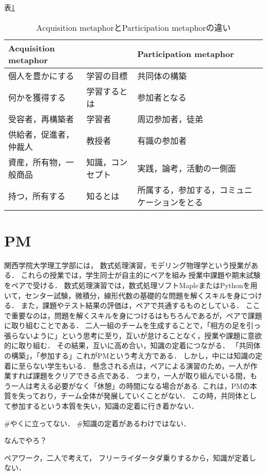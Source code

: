 \documentclass{jsarticle}
\begin{document}
表\ref{tab:org1ce3c3b}
\begin{table}[htbp]
\caption{\label{tab:org1ce3c3b}
Acquisition metaphorとParticipation metaphorの違い}
\centering
\begin{tabular}{|l|l|l|}
\hline
Acquisition metaphor &  & Participation metaphor\\
\hline
個人を豊かにする & 学習の目標 & 共同体の構築\\
何かを獲得する & 学習するとは & 参加者となる\\
受容者，再構築者 & 学習者 & 周辺参加者，徒弟\\
供給者，促進者，仲裁人 & 教授者 & 有識の参加者\\
資産，所有物，一般商品 & 知識，コンセプト & 実践，論考，活動の一側面\\
持つ，所有する & 知るとは & 所属する，参加する，コミュニケーションをとる\\
\hline
\end{tabular}
\end{table}

\section{PM}
\label{sec:org6f32b3c}
関西学院大学理工学部には，
数式処理演習，モデリング物理学という授業がある．
これらの授業では，学生同士が自主的にペアを組み
授業中課題や期末試験をペアで受ける．
数式処理演習では，数式処理ソフトMapleまたはPythonを用いて，センター試験，微積分，線形代数の基礎的な問題を解くスキルを身につける．
また，課題やテスト結果の評価は，ペアで共通するものとしている．
ここで重要なのは，問題を解くスキルを身につけるはもちろんであるが，ペアで課題に取り組むことである．
二人一組のチームを生成することで，「相方の足を引っ張らないように」という思考に至り，互いが怠けることなく，授業や課題に意欲的に取り組む．
その結果，互いに高め合い，知識の定着につながる．
「共同体の構築」，「参加する」これがPMという考え方である．
しかし，中には知識の定着に至らない学生もいる．
懸念される点は，ペアによる演習のため，一人が作業すれば課題をクリアできる点である．
つまり，一人が取り組んでいる間，もう一人は考える必要がなく「休憩」の時間になる場合がある.
これは，PMの本質を失っており，チーム全体が発展していくことがない．
この時，共同体として参加するという本質を失い，知識の定着に行き着かない．


\#やくに立ってない．
\#知識の定着があるわけではない．

なんでやろ？

ペアワーク，二人で考えて，
フリーライダータダ乗りするから，知識が定着しない．
\end{document}
